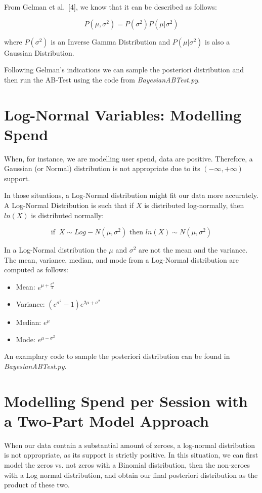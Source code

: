 \documentclass[11pt, a4wide]{article}   	%
\begin{document}
From Gelman et al.~[4], we know that it can be described as follows:

\begin{equation}
P(\mu,\sigma^2) = P(\sigma^2)P(\mu|\sigma^2)
\end{equation}

where $P(\sigma^2)$ is an Inverse Gamma Distribution and $P(\mu|\sigma^2)$ is also a Gaussian Distribution.

Following Gelman's indications we can sample the posteriori distribution and then run the AB-Test using the code from \emph{BayesianABTest.py}.


\section{Log-Normal Variables: Modelling Spend}

When, for instance, we are modelling user spend, data are positive. Therefore, a Gaussian (or Normal) distribution is not appropriate due to its $(-\infty,+\infty)$ support.

In those situations, a Log-Normal distribution might fit our data more accurately. A Log-Normal Distribution is such that if $X$ is distributed log-normally, then $ln(X)$ is distributed normally:

\begin{equation}
\text{if}\;\; X\sim Log-N(\mu,\sigma^2) \text{   then   } ln(X) \sim N(\mu,\sigma^2)
\end{equation}

In a Log-Normal distribution the $\mu$ and $\sigma^2$ are not the mean and the variance. The mean, variance, median, and mode from a Log-Normal distribution are computed as follows:

\begin{itemize}
\item Mean: $e^{\mu+\frac{\sigma^2}{2}}$
\item Variance: $(e^{\sigma^2}-1)e^{2\mu+\sigma^2}$
\item Median: $e^{\mu}$
\item Mode: $e^{\mu-\sigma^2}$
\end{itemize}

An examplary code to sample the posteriori distribution can be found in \emph{BayesianABTest.py}.

\section{Modelling Spend per Session with a Two-Part Model Approach}
When our data contain a substantial amount of zeroes, a log-normal distribution is not appropriate, as its support is strictly positive. In this situation, we can first model the zeros vs. not zeros with a Binomial distribution, then the non-zeroes with a Log normal distribution, and obtain our final posteriori distribution as the product of these two.
\end{document}

